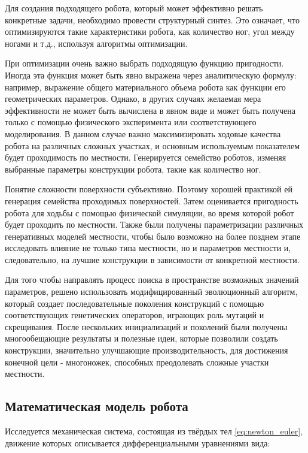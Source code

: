 Для создания подходящего робота, который может эффективно решать конкретные задачи, необходимо провести структурный синтез. Это означает, что оптимизируются такие характеристики робота, как количество ног, угол между ногами и т.д., используя алгоритмы оптимизации.

При оптимизации очень важно выбрать подходящую функцию пригодности. Иногда эта функция может быть явно выражена через аналитическую формулу: например, выражение общего материального объема робота как функции его геометрических параметров. Однако, в других случаях желаемая мера эффективности не может быть вычислена в явном виде и может быть получена только с помощью физического эксперимента или соответствующего моделирования. В данном случае важно максимизировать ходовые качества робота на различных сложных участках, и основным используемым показателем будет проходимость по местности. Генерируется семейство роботов, изменяя выбранные параметры конструкции робота, такие как количество ног.

Понятие сложности поверхности субъективно. Поэтому хорошей практикой ей генерация семейства проходимых поверхностей. Затем оценивается пригодность робота для ходьбы с помощью физической симуляции, во время которой робот будет проходить по местности. Также были получены параметризации различных генеративных моделей местности, чтобы было возможно на более позднем этапе исследовать влияние не только типа местности, но и параметров местности и, следовательно, на лучшие конструкции в зависимости от конкретной местности.

Для того чтобы направлять процесс поиска в пространстве возможных значений параметров, решено использовать модифицированный эволюционный алгоритм, который создает последовательные поколения конструкций с помощью соответствующих генетических операторов, играющих роль мутаций и скрещивания. После нескольких инициализаций и поколений были получены многообещающие результаты и полезные идеи, которые позволили создать конструкции, значительно улучшающие производительность, для достижения конечной цели - многоножек, способных преодолевать сложные участки местности.

\subsection{Математическая модель робота}
Исследуется механическая система, состоящая из твёрдых тел \eqref{eq:newton_euler}, движение которых описывается дифференциальными уравнениями вида:


